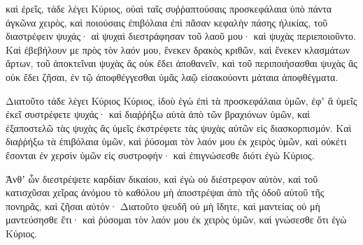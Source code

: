 {καὶ ἐρεῖς, τάδε λέγει Κύριος, οὐαὶ ταῖς συῤῥαπτούσαις προσκεφάλαια ὑπὸ πάντα ἀγκῶνα χειρὸς, καὶ ποιούσαις ἐπιβόλαια ἐπὶ πᾶσαν κεφαλὴν πάσης ἡλικίας, τοῦ διαστρέφειν ψυχάς· αἱ ψυχαὶ διεστράφησαν τοῦ λαοῦ μου· καὶ ψυχὰς περιεποιοῦντο.
Καὶ ἐβεβήλουν με πρὸς τὸν λαόν μου, ἕνεκεν δρακὸς κριθῶν, καὶ ἕνεκεν κλασμάτων ἄρτων, τοῦ ἀποκτεῖναι ψυχὰς ἃς οὐκ ἔδει ἀποθανεῖν, καὶ τοῦ περιποιήσασθαι ψυχὰς ἃς οὐκ ἔδει ζῆσαι, ἐν τῷ ἀποφθέγγεσθαι ὑμᾶς λαῷ εἰσακούοντι μάταια ἀποφθέγματα.
\par }{\PP {}Διατοῦτο τάδε λέγει Κύριος Κύριος, ἰδοὺ ἐγὼ ἐπὶ τὰ προσκεφάλαια ὑμῶν, ἐφʼ ἃ ὑμεῖς ἐκεῖ συστρέφετε ψυχάς· καὶ διαῤῥήξω αὐτὰ ἀπὸ τῶν βραχιόνων ὑμῶν, καὶ ἐξαποστελῶ τὰς ψυχὰς ἃς ὑμεῖς ἐκστρέφετε τὰς ψυχὰς αὐτῶν εἰς διασκορπισμόν.
Καὶ διαῤῥήξω τὰ ἐπιβόλαια ὑμῶν, καὶ ῥύσομαι τὸν λαόν μου ἐκ χειρὸς ὑμῶν, καὶ οὐκέτι ἔσονται ἐν χερσὶν ὑμῶν εἰς συστροφήν· καὶ ἐπιγνώσεσθε διότι ἐγὼ Κύριος.
\par }{\PP {}Ἀνθʼ ὧν διεστρέψετε καρδίαν δικαίου, καὶ ἐγὼ οὐ διέστρεφον αὐτὸν, καὶ τοῦ κατισχῦσαι χεῖρας ἀνόμου τὸ καθόλου μὴ ἀποστρέψαι ἀπὸ τῆς ὁδοῦ αὐτοῦ τῆς πονηρᾶς, καὶ ζῆσαι αὐτόν·
Διατοῦτο ψευδῆ οὐ μὴ ἴδητε, καὶ μαντείας οὐ μὴ μαντεύσησθε ἔτι· καὶ ῥύσομαι τὸν λαόν μου ἐκ χειρὸς ὑμῶν, καὶ γνώσεσθε ὅτι ἐγὼ Κύριος.

}
